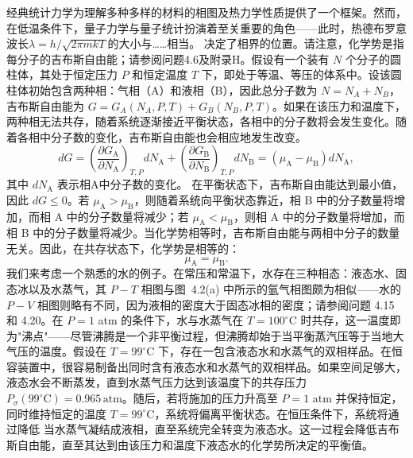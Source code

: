 经典统计力学为理解多种多样的材料的相图及热力学性质提供了一个框架。然而，在低温条件下，量子力学与量子统计扮演着至关重要的角色——此时，热德布罗意波长\(\lambda = h/\sqrt{2\pi mkT}\)的大小与\ldots\ldots 相当。
决定了相界的位置。请注意，化学势是指每分子的吉布斯自由能；请参阅问题4.6及附录H。假设有一个装有 \(N\) 个分子的圆柱体，其处于恒定压力 \(P\) 和恒定温度 \(T\) 下，即处于等温、等压的体系中。设该圆柱体初始包含两种相：气相（A）和液相（B），因此总分子数为 \(N = N_A + N_B\)，吉布斯自由能为 \(G = G_A(N_A, P, T) + G_B(N_B, P, T)\)。如果在该压力和温度下，两种相无法共存，随着系统逐渐接近平衡状态，各相中的分子数将会发生变化。随着各相中分子数的变化，吉布斯自由能也会相应地发生改变。
\begin{equation}\tag{4.5.15}\label{eq:4.5.15}
d G = \left( \frac { \partial G _ { \mathrm { A } } } { \partial N _ { \mathrm { A } } } \right) _ { T , P } d N _ { \mathrm { A } } + \left( \frac { \partial G _ { \mathrm { B } } } { \partial N _ { \mathrm { B } } } \right) _ { T , P } d N _ { \mathrm { B } } = ( \mu _ { \mathrm { A } } - \mu _ { \mathrm { B } } ) d N _ { \mathrm { A } } ,
\end{equation}
其中 \(dN_{\mathrm{A}}\) 表示相A中分子数的变化。
在平衡状态下，吉布斯自由能达到最小值，因此 \(dG \leq 0\)。若 \(\mu_{\mathrm{A}} > \mu_{\mathrm{B}}\)，则随着系统向平衡状态靠近，相 B 中的分子数量将增加，而相 A 中的分子数量将减少；若 \(\mu_{\mathrm{A}} < \mu_{\mathrm{B}}\)，则相 A 中的分子数量将增加，而相 B 中的分子数量将减少。当化学势相等时，吉布斯自由能与两相中分子的数量无关。因此，在共存状态下，化学势是相等的：
\begin{equation}\tag{4.5.16}\label{eq:4.5.16}
\mu _ { \mathrm { A } } = \mu _ { \mathrm { B } } .
\end{equation}
我们来考虑一个熟悉的水的例子。在常压和常温下，水存在三种相态：液态水、固态冰以及水蒸气，其 \(P-T\) 相图与图~4.2(a) 中所示的氩气相图颇为相似——水的 \(P-V\) 相图则略有不同，因为液相的密度大于固态冰相的密度；请参阅问题 4.15 和 4.20。在 \(P=1\) atm 的条件下，水与水蒸气在 \(T=100^{\circ}\mathrm{C}\) 时共存，这一温度即为"沸点"——尽管沸腾是一个非平衡过程，但沸腾却始于当平衡蒸汽压等于当地大气压的温度。假设在 \(T=99^{\circ}\mathrm{C}\) 下，存在一包含液态水和水蒸气的双相样品。在恒容装置中，很容易制备出同时含有液态水和水蒸气的双相样品。如果空间足够大，液态水会不断蒸发，直到水蒸气压力达到该温度下的共存压力 \(P_{\sigma}(99^{\circ}\mathrm{C})=0.965\,\mathrm{atm}\)。随后，若将施加的压力升高至 \(P=1\) atm 并保持恒定，同时维持恒定的温度 \(T=99^{\circ}\mathrm{C}\)，系统将偏离平衡状态。在恒压条件下，系统将通过降低
当水蒸气凝结成液相，直至系统完全转变为液态水。这一过程会降低吉布斯自由能，直至其达到由该压力和温度下液态水的化学势所决定的平衡值。
